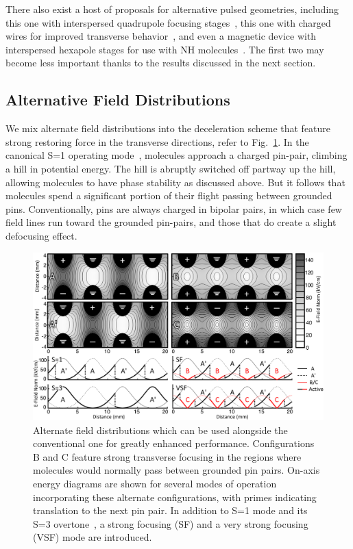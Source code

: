 There also exist a host of proposals for alternative pulsed geometries, including this one with interspersed quadrupole focusing stages~\cite{Sawyer2008a}, this one with charged wires for improved transverse behavior~\cite{Wang2016}, and even a magnetic device with interspersed hexapole stages for use with NH molecules~\cite{Plomp2019}. The first two may become less important thanks to the results discussed in the next section.

\subsection{Alternative Field Distributions}

We mix alternate field distributions into the deceleration scheme that feature strong restoring force in the transverse directions, refer to Fig.~\ref{fig:chargecartoon}.
In the canonical S=1 operating mode~\cite{VanDeMeerakker2012}, molecules approach a charged pin-pair, climbing a hill in potential energy. 
The hill is abruptly switched off partway up the hill, allowing molecules to have phase stability as discussed above.
But it follows that molecules spend a significant portion of their flight passing between grounded pins.
Conventionally, pins are always charged in bipolar pairs, in which case few field lines run toward the grounded pin-pairs, and those that do create a slight defocusing effect. 

\begin{figure}[t!]
\includegraphics[width=\linewidth]{Slowing/pinpairformal.png}%
\caption[Definition and Explanation of Alternate Field Distributions]{\label{fig:chargecartoon}
Alternate field distributions which can be used alongside the conventional one for greatly enhanced performance. Configurations B and C feature strong transverse focusing in the regions where molecules would normally pass between grounded pin pairs. On-axis energy diagrams are shown for several modes of operation incorporating these alternate configurations, with primes indicating translation to the next pin pair. In addition to S=1 mode and its S=3 overtone~\cite{VanDeMeerakker2005a}, a strong focusing (SF) and a very strong focusing (VSF) mode are introduced.
}
\end{figure}


